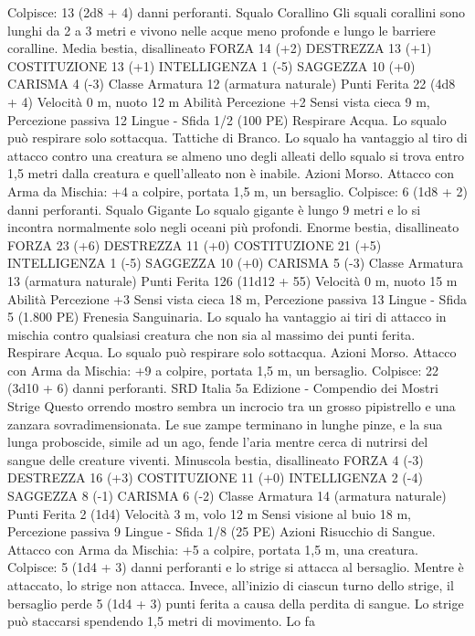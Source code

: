\begin{multicols}{2}
Colpisce: 13 (2d8 + 4) danni perforanti.
Squalo Corallino
Gli squali corallini sono lunghi da 2 a 3 metri e vivono
nelle acque meno profonde e lungo le barriere coralline.
Media bestia, disallineato
FORZA 14 (+2)
DESTREZZA 13 (+1)
COSTITUZIONE 13 (+1)
INTELLIGENZA 1 (-5)
SAGGEZZA 10 (+0)
CARISMA 4 (-3)
Classe Armatura 12 (armatura naturale)
Punti Ferita 22 (4d8 + 4)
Velocità 0 m, nuoto 12 m
Abilità Percezione +2
Sensi vista cieca 9 m, Percezione passiva 12
Lingue -
Sfida 1/2 (100 PE)
Respirare Acqua. Lo squalo può respirare solo sottacqua.
Tattiche di Branco. Lo squalo ha vantaggio al tiro di attacco
contro una creatura se almeno uno degli alleati dello squalo si
trova entro 1,5 metri dalla creatura e quell’alleato non è inabile.
Azioni
Morso. Attacco con Arma da Mischia: +4 a colpire, portata 1,5
m, un bersaglio.
Colpisce: 6 (1d8 + 2) danni perforanti.
Squalo Gigante
Lo squalo gigante è lungo 9 metri e lo si incontra
normalmente solo negli oceani più profondi.
Enorme bestia, disallineato
FORZA 23 (+6)
DESTREZZA 11 (+0)
COSTITUZIONE 21 (+5)
INTELLIGENZA 1 (-5)
SAGGEZZA 10 (+0)
CARISMA 5 (-3)
Classe Armatura 13 (armatura naturale)
Punti Ferita 126 (11d12 + 55)
Velocità 0 m, nuoto 15 m
Abilità Percezione +3
Sensi vista cieca 18 m, Percezione passiva 13
Lingue -
Sfida 5 (1.800 PE)
Frenesia Sanguinaria. Lo squalo ha vantaggio ai tiri di attacco
in mischia contro qualsiasi creatura che non sia al massimo dei
punti ferita.
Respirare Acqua. Lo squalo può respirare solo sottacqua.
Azioni
Morso. Attacco con Arma da Mischia: +9 a colpire, portata 1,5
m, un bersaglio.
Colpisce: 22 (3d10 + 6) danni perforanti.
SRD Italia 5a Edizione - Compendio dei Mostri
Strige
Questo orrendo mostro sembra un incrocio tra un
grosso pipistrello e una zanzara sovradimensionata. Le
sue zampe terminano in lunghe pinze, e la sua lunga
proboscide, simile ad un ago, fende l’aria mentre cerca
di nutrirsi del sangue delle creature viventi.
Minuscola bestia, disallineato
FORZA 4 (-3)
DESTREZZA 16 (+3)
COSTITUZIONE 11 (+0)
INTELLIGENZA 2 (-4)
SAGGEZZA 8 (-1)
CARISMA 6 (-2)
Classe Armatura 14 (armatura naturale)
Punti Ferita 2 (1d4)
Velocità 3 m, volo 12 m
Sensi visione al buio 18 m, Percezione passiva 9
Lingue -
Sfida 1/8 (25 PE)
Azioni
Risucchio di Sangue. Attacco con Arma da Mischia: +5 a
colpire, portata 1,5 m, una creatura.
Colpisce: 5 (1d4 + 3) danni perforanti e lo strige si attacca al
bersaglio. Mentre è attaccato, lo strige non attacca. Invece,
all’inizio di ciascun turno dello strige, il bersaglio perde 5 (1d4 +
3) punti ferita a causa della perdita di sangue.
Lo strige può staccarsi spendendo 1,5 metri di movimento. Lo fa

\end{multicols}

